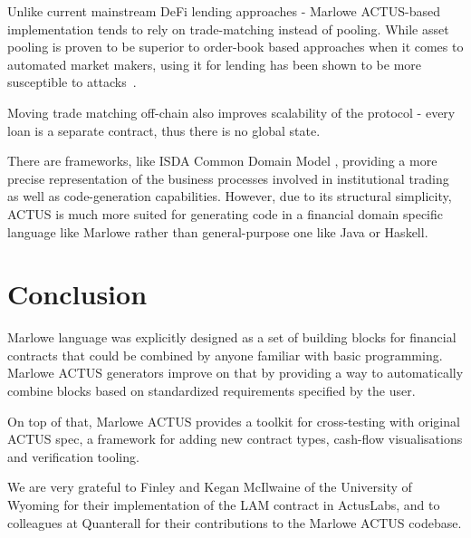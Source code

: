 \documentclass[runningheads]{llncs}
\begin{document}


Unlike current mainstream DeFi lending approaches - Marlowe ACTUS-based
implementation tends to rely on trade-matching instead of pooling.
While asset pooling is proven to be superior to order-book based approaches
when it comes to automated market makers, using it for lending has
been shown to be more susceptible to attacks~\cite{flash-loan}.

Moving trade matching off-chain also improves scalability of the protocol
- every loan is a separate contract, thus there is no global state.

There are frameworks, like ISDA Common Domain Model \cite{isda-cdm}, providing a
more precise representation of the business processes involved in institutional trading 
as well as code-generation capabilities. However, due to its structural simplicity, ACTUS 
is much more suited for generating code in a financial domain specific language 
like Marlowe rather than general-purpose one like Java or Haskell.

\section{Conclusion}
\label{conclusion}

Marlowe language was explicitly designed as a set of building blocks
for financial contracts that could be combined by anyone familiar
with basic programming. Marlowe ACTUS generators improve on that by
providing a way to automatically combine blocks based on standardized
requirements specified by the user.

On top of that, Marlowe ACTUS provides a toolkit for cross-testing
with original ACTUS spec, a framework for adding new contract types,
cash-flow visualisations and verification tooling.

We are very grateful to Finley and Kegan McIlwaine of the University of Wyoming for their implementation of the LAM contract in ActusLabs, and to colleagues at Quanterall%
for their contributions to the Marlowe ACTUS codebase.

%
%
%


%
\end{document}
